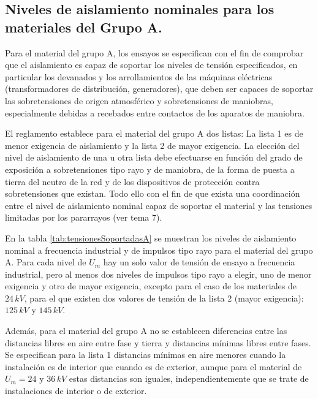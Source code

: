         \subsection{Niveles de aislamiento nominales para los materiales del Grupo A.}
            Para el material del grupo A, los ensayos se especifican con el fin de comprobar que el aislamiento es capaz de soportar los niveles de tensión especificados, en particular los devanados y los arrollamientos de las máquinas eléctricas (transformadores de distribución, generadores), que deben ser capaces de soportar las sobretensiones de origen atmosférico y sobretensiones de maniobras, especialmente debidas a recebados entre contactos de los aparatos de maniobra.\newline
            
            El reglamento establece para el material del grupo A dos listas: La lista 1 es de menor exigencia de aislamiento y la lista 2 de mayor exigencia. La elección del nivel de aislamiento de una u otra lista debe efectuarse en función del grado de exposición a sobretensiones tipo rayo y de maniobra, de la forma de puesta a tierra del neutro de la red y de los dispositivos de protección contra sobretensiones que existan. Todo ello con el fin de que exista una coordinación entre el nivel de aislamiento nominal capaz de soportar el material y las tensiones limitadas por los pararrayos (ver tema 7).\newline
            
            En la tabla \ref{tab:tensionesSoportadasA} se muestran los niveles de aislamiento nominal a frecuencia industrial y de impulsos tipo rayo para el material del grupo A. Para cada nivel de $U_\textit{m}$ hay un solo valor de tensión de ensayo a frecuencia industrial, pero al menos dos niveles de impulsos tipo rayo a elegir, uno de menor exigencia y otro de mayor exigencia, excepto para el caso de los materiales de $24\,\textit{kV}$, para el que existen dos valores de tensión de la lista 2 (mayor exigencia): $125\,\textit{kV}$ y $145\,\textit{kV}$.\newline
            
            Además, para el material del grupo A no se establecen diferencias entre las distancias libres en aire entre fase y tierra y distancias mínimas libres entre fases. Se especifican para la lista 1 distancias mínimas en aire menores cuando la instalación es de interior que cuando es de exterior, aunque para el material de $U_\textit{m}=24\text{ y }36\,\textit{kV}$ estas distancias son iguales, independientemente que se trate de instalaciones de interior o de exterior.\newline
            
